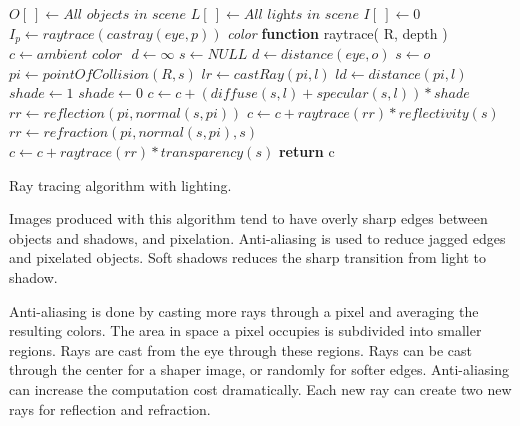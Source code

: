 \begin{algorithm}[H]
\begin{algorithmic}[1]
\STATE $O[\ ] \gets \textit{All objects in scene}$ 
\STATE $L[\ ] \gets \textit{All lights in scene}$
\STATE $I[\ ] \gets 0$ 
\STATE
{}
	\STATE $I_{p} \gets raytrace( castray( eye, p ))$
\ENDFOR
\STATE 
\STATE \textit{color} \textbf{function} raytrace(  R, depth )
	\STATE $c  \gets \textit{ambient color } $
	\STATE $d \gets \infty $
	\STATE $s \gets \textit{NULL}$
				\STATE $d \gets distance( \textit{eye}, o )$
				\STATE $s \gets o$
			\ENDIF
		\ENDIF
	\ENDFOR
		\STATE {}
		\STATE $pi \gets pointOfCollision( R, s )$
			\STATE $lr \gets castRay( pi, l )$
			\STATE $ld \gets distance( pi, l )$
			\STATE $shade \gets 1$
					\STATE $shade \gets 0$				
				\ENDIF
				\STATE $c \gets c +( diffuse( s, l ) + specular( s, l )) * shade$ 
			\ENDFOR
		\ENDFOR
		\STATE {}
			\STATE $rr \gets reflection( pi, normal( s, pi ))$
			\STATE $c \gets c + raytrace( rr ) * reflectivity( s )$
		\ENDIF
		\STATE {}
			\STATE $rr \gets refraction( pi, normal( s, pi ), s )$
			\STATE $c \gets c + raytrace( rr ) * transparency( s )$
		\ENDIF
	\ENDIF
	\STATE \textbf{return} c

\end{algorithmic}
\caption{ Ray tracing algorithm with lighting. }
\label{ray-trace-full}
\end{algorithm}
\newpage

Images produced with this algorithm tend to have overly sharp edges between objects and shadows, and pixelation.  Anti-aliasing is used to reduce jagged edges and pixelated objects. Soft shadows reduces the sharp transition from light to shadow.

Anti-aliasing is done by casting more rays through a pixel and averaging the resulting colors.  The area in space a pixel occupies is subdivided into smaller regions.  Rays are cast from the eye through these regions.  Rays can be cast through the center for a shaper image, or randomly for softer edges.  Anti-aliasing can increase the computation cost dramatically.  Each new ray can create two new rays for reflection and refraction.

